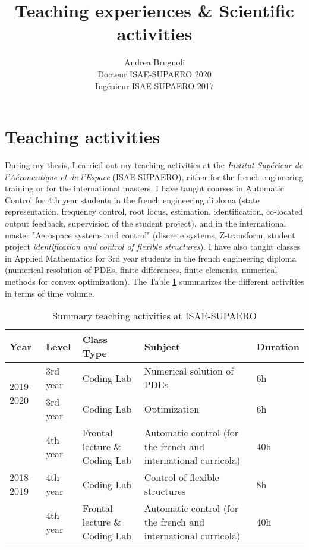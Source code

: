 \documentclass[12pt]{article}
\author{Andrea Brugnoli \\ 
	\hspace{2.8pt} Docteur ISAE-SUPAERO 2020\\
	Ingénieur ISAE-SUPAERO 2017}
\title{Teaching experiences \& Scientific activities}
\date{}
\begin{document}
	
	\maketitle
	
	
	\thispagestyle{empty}
	
	\tableofcontents
	
	
	\section{Teaching activities}
	
	During my thesis, I carried out my teaching activities at the \textit{Institut Supérieur de l'Aéronautique et de l'Espace} (ISAE-SUPAERO), either for the french engineering training or for the international masters. I have taught courses in Automatic Control for 4th year students in the french engineering diploma (state representation, frequency control, root locus, estimation, identification, co-located output feedback, supervision of the student project), and in the international master "Aerospace systems and control" (discrete systems, Z-transform, student project \textit{identification and control of flexible structures}). I have also taught classes in Applied Mathematics for 3rd year students in the french engineering diploma (numerical resolution of PDEs, finite differences, finite elements, numerical methods for convex optimization). The Table \ref{tab:teaching} summarizes the different activities in terms of time volume.
	
	
	\begin{table}[h]
		\centering
		\begin{tabular}{p{}p{}p{}p{}p{}}
			\hline
			Year & Level & Class Type  & Subject & Duration  \\
			\hline
			\multirow{2}{*}{2019-2020} & 3rd year & Coding Lab &  Numerical solution of PDEs & 6h \\
			& 3rd year & Coding Lab &  Optimization & 6h \\
			\hline
			\multirow{3}{*}{2018-2019} & 4th year  & Frontal lecture \& Coding Lab & Automatic control (for the french and international curricola) & 40h \\
			& 4th year  & Coding Lab & Control of flexible structures & 8h \\
			\hline
			\multirow{2}{*}{2017-2018} & 4th year  & Frontal lecture \& Coding Lab & Automatic control (for the french and international curricola) & 40h \\			   
			\hline
		\end{tabular}
		\caption{Summary teaching activities at ISAE-SUPAERO}
		\label{tab:teaching}
	\end{table}
	
\end{document}
